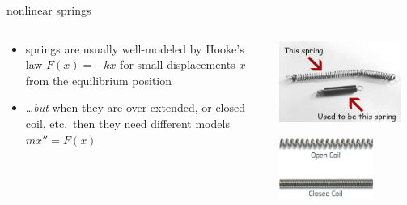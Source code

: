 \documentclass[urlcolor=blue,dvipsnames]{beamer}
\begin{document}
\begin{frame}{nonlinear springs}

\begin{columns}
\begin{column}{0.65\textwidth}
\begin{itemize}
\item springs are usually well-modeled by Hooke's law $F(x)=-kx$ for small displacements $x$ from the equilibrium position
\item \dots \emph{but} when they are over-extended, or closed coil, etc.~then they need different models $mx''=F(x)$
\end{itemize}
\end{column}
\begin{column}{0.35\textwidth}
\includegraphics[width=0.9\textwidth]{figs/spring-failure}

\vspace{3mm}

\includegraphics[width=0.7\textwidth]{figs/open-closed-spring}
\end{column}
\end{columns}

\bigskip


\end{frame}
\end{document}
